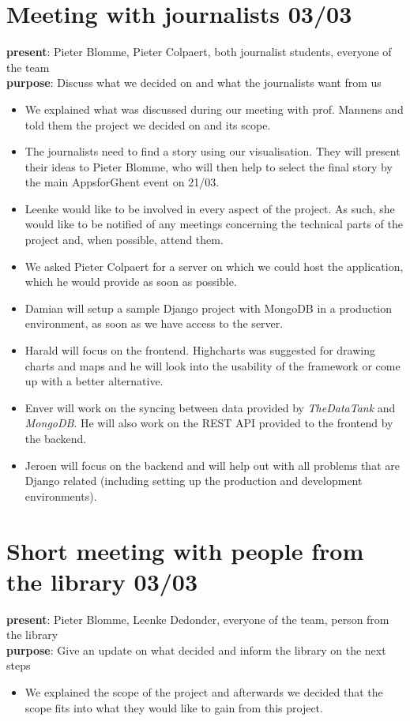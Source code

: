 \section{Meeting with journalists 03/03}
{\bf present}: Pieter Blomme, Pieter Colpaert, both journalist students, everyone of the team\\
{\bf purpose}: Discuss what we decided on and what the journalists want from us\\
\begin{itemize}
  \item We explained what was discussed during our meeting with prof. Mannens and told them the project we decided on and its scope.
  \item The journalists need to find a story using our visualisation. They will present their ideas to Pieter Blomme, who will then help to select the final story by the main AppsforGhent event on 21/03.
  \item Leenke would like to be involved in every aspect of the project. As such, she would like to be notified of any meetings concerning the technical parts of the project and, when possible, attend them.
  \item We asked Pieter Colpaert for a server on which we could host the application, which he would provide as soon as possible.
  \item Damian will setup a sample Django project with MongoDB in a production environment, as soon as we have access to the server.
  \item Harald will focus on the frontend. Highcharts was suggested for drawing charts and maps and he will look into the usability of the framework or come up with a better alternative.
  \item Enver will work on the syncing between data provided by \emph{TheDataTank} and \emph{MongoDB}. He will also work on the REST API provided to the frontend by the backend.
  \item Jeroen will focus on the backend and will help out with all problems that are Django related (including setting up the production and development environments).
\end{itemize}

\section{Short meeting with people from the library 03/03}
{\bf present}: Pieter Blomme, Leenke Dedonder, everyone of the team, person from the library\\
{\bf purpose}: Give an update on what decided and inform the library on the next steps\\
\begin{itemize}
  \item We explained the scope of the project and afterwards we decided that the scope fits into what they would like to gain from this project.
\end{itemize}

